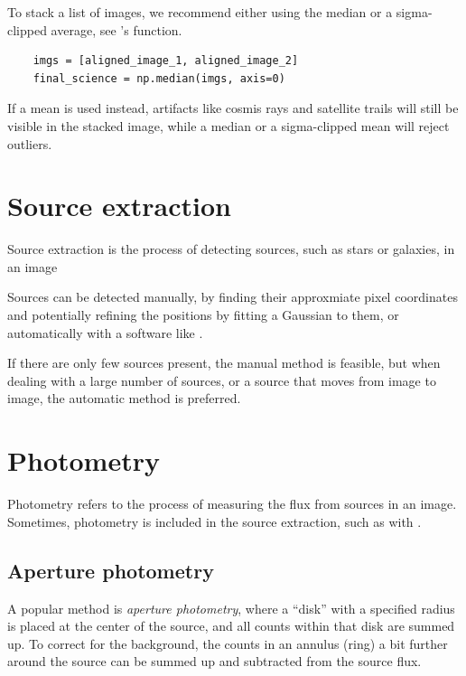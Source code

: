 \documentclass[a4paper, 11pt, fleqn]{memoir}
\begin{document}
To stack a list of images, we recommend either using the median or a sigma-clipped average, see 's  function.
\begin{verbatim}
    imgs = [aligned_image_1, aligned_image_2]
    final_science = np.median(imgs, axis=0)
\end{verbatim}
If a mean is used instead, artifacts like cosmis rays and satellite trails will still be visible in the stacked image, while a median or a sigma-clipped mean will reject outliers.

\section{Source extraction}
\label{ssec:source-extraction}

Source extraction is the process of detecting sources, such as stars or galaxies, in an image

Sources can be detected manually, by finding their approxmiate pixel coordinates and potentially refining the positions by fitting a Gaussian to them, or automatically with a software like .

If there are only few sources present, the manual method is feasible, but when dealing with a large number of sources, or a source that moves from image to image, the automatic method is preferred.


\section{Photometry}
\label{ssec:photometry}

Photometry refers to the process of measuring the flux from sources in an image.
Sometimes, photometry is included in the source extraction, such as with .

\subsection{Aperture photometry}
\label{ssec:aperture-photometry}
A popular method is \emph{aperture photometry}, where a \enquote{disk} with a specified radius is placed at the center of the source, and all counts within that disk are summed up.
To correct for the background, the counts in an annulus (ring) a bit further around the source can be summed up and subtracted from the source flux.
\end{document}
